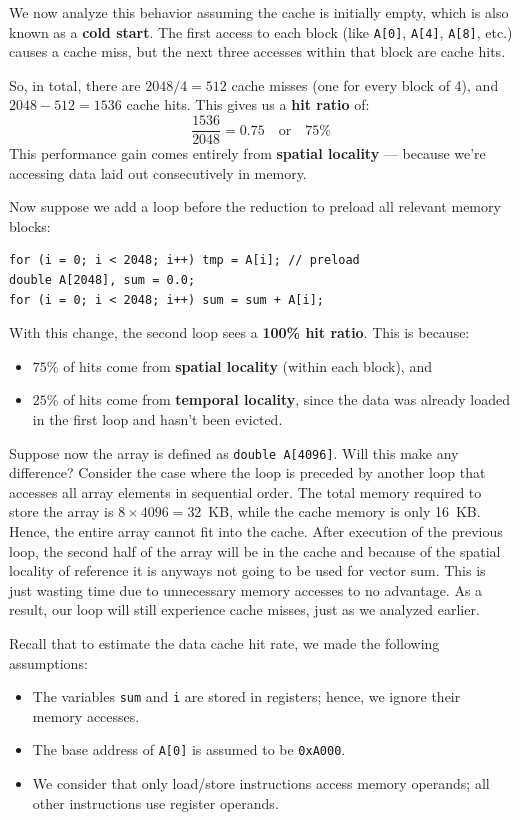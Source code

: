\documentclass[12pt]{book}
\begin{document}
We now analyze this behavior assuming the cache is initially empty, which is also known as a \textbf{cold start}. The first access to each block (like \texttt{A[0]}, \texttt{A[4]}, \texttt{A[8]}, etc.) causes a cache miss, but the next three accesses within that block are cache hits. 

So, in total, there are $2048 / 4 = 512$ cache misses (one for every block of 4), and $2048 - 512 = 1536$ cache hits. This gives us a \textbf{hit ratio} of:
\[
\frac{1536}{2048} = 0.75 \quad \text{or} \quad 75\%
\]
This performance gain comes entirely from \textbf{spatial locality} — because we're accessing data laid out consecutively in memory.

Now suppose we add a loop before the reduction to preload all relevant memory blocks:
\begin{lstlisting}[caption={Preloading the Array for Temporal Locality}]
for (i = 0; i < 2048; i++) tmp = A[i]; // preload
double A[2048], sum = 0.0;
for (i = 0; i < 2048; i++) sum = sum + A[i];
\end{lstlisting}

With this change, the second loop sees a \textbf{100\% hit ratio}. This is because:
\begin{itemize}
    \item $75\%$ of hits come from \textbf{spatial locality} (within each block), and
    \item $25\%$ of hits come from \textbf{temporal locality}, since the data was already loaded in the first loop and hasn't been evicted.
\end{itemize}

Suppose now the array is defined as \texttt{double A[4096]}. Will this make any difference? Consider the case where the loop is preceded by another loop that accesses all array elements in sequential order. The total memory required to store the array is $8 \times 4096 = 32$~KB, while the cache memory is only 16~KB. Hence, the entire array cannot fit into the cache. After execution of the previous loop, the second half of the array will be in the cache and because of the spatial locality of reference it is anyways not going to be used for vector sum. This is just wasting time due to unnecessary memory accesses to no advantage. As a result, our loop will still experience cache misses, just as we analyzed earlier.

Recall that to estimate the data cache hit rate, we made the following assumptions:
\begin{itemize}
    \item The variables \texttt{sum} and \texttt{i} are stored in registers; hence, we ignore their memory accesses.
    \item The base address of \texttt{A[0]} is assumed to be \texttt{0xA000}.
    \item We consider that only load/store instructions access memory operands; all other instructions use register operands.
\end{itemize}
\end{document}
